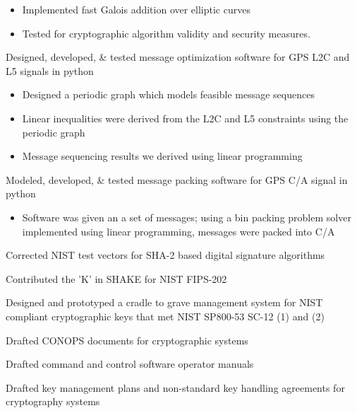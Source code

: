 \documentclass[letterpaper]{clinton-resume}
\begin{document}
\begin{minipage}[t]{0.66\textwidth}
\begin{tightitemize}
\begin{itemize}
\item  Implemented fast Galois addition over elliptic curves
\item Tested for cryptographic algorithm validity and security measures.
\end{itemize}
\item Designed, developed, \& tested message optimization software for GPS L2C and L5 signals in python
\begin{itemize}
\item Designed a periodic graph which models feasible message sequences
\item Linear inequalities were derived from the L2C and L5 constraints using the periodic graph
\item Message sequencing results we derived using linear programming
\end{itemize}
\item Modeled, developed, \& tested message packing software for GPS C/A signal in python
\begin{itemize}
\item Software was given an a set of messages; using a bin packing problem solver implemented using linear programming, messages were packed into C/A
\end{itemize}
\item Corrected NIST test vectors for SHA-2 based digital signature algorithms
\item Contributed the 'K' in SHAKE for NIST FIPS-202
\item Designed and prototyped a cradle to grave management system for NIST compliant cryptographic keys that met NIST SP800-53 SC-12 (1) and (2)
\item Drafted CONOPS documents for cryptographic systems
\item Drafted command and control software operator manuals
\item Drafted key management plans and non-standard key handling agreements for cryptography systems
\end{tightitemize}
\sectionspace




\end{minipage}
\newpage
\begin{minipage}[t]{0.33\textwidth}
\hspace{0.33\textwidth}
\end{minipage}
\end{document}
